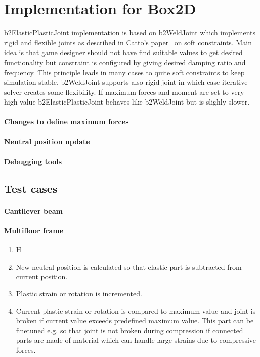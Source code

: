 \documentclass{jcgt}
\begin{document}
\section{Implementation for Box2D}
b2ElasticPlasticJoint implementation is based on b2WeldJoint which implements rigid and flexible joints as
described in Catto's paper~ on soft constraints. Main idea is that game designer should not have
find suitable values to get desired functionality but constraint is configured by giving desired  damping ratio and frequency.
This principle leads in many cases to quite soft constraints to keep simulation stable. 
b2WeldJoint supports also rigid joint in which case iterative solver creates some flexibility.
If maximum forces and moment are set to very high value b2ElasticPlasticJoint behaves like b2WeldJoint but is slighly slower.

\paragraph{Changes to define maximum forces} 

\paragraph{Neutral position update} 

\paragraph{Debugging tools} 

\subsection{Test cases} 

\paragraph{Cantilever beam} 

\paragraph{Multifloor frame} 


\begin{enumerate}
\item H
\item New neutral position is calculated so that elastic part is subtracted from current position.
\item Plastic strain or rotation is incremented.
\item Current plastic strain or rotation is compared to maximum value and joint is broken if 
current value exceeds predefined maximum value. This part can be finetuned e.g. so that joint is 
not broken during compression if connected parts are made of material which can handle large
strains due to compressive forces. 
\end{enumerate}
\end{document}
